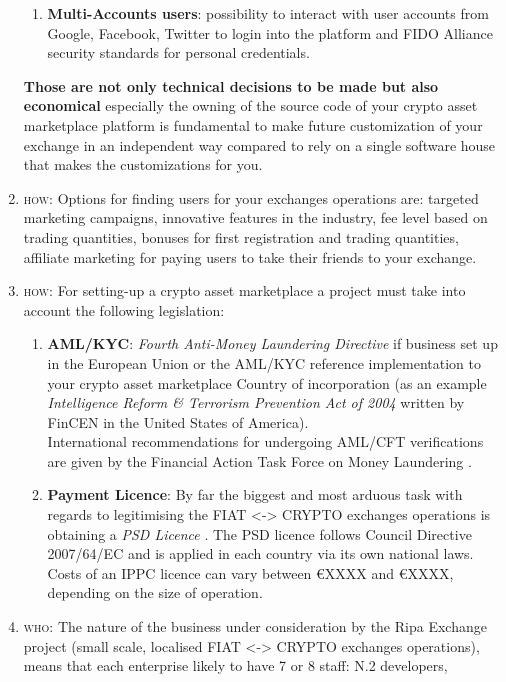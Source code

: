 \documentclass[11pt,fleqn,oneside]{book} %
\begin{document}
\begin{enumerate}
\begin{enumerate}[label*=\arabic*.]
			\item \textbf{Multi-Accounts users}: possibility to interact with user accounts from Google, Facebook, Twitter 
			to login into the platform and FIDO Alliance security standards for personal credentials.
		\end{enumerate}	
	\textbf{Those are not only technical decisions to be made but also economical} especially the owning of the source code of your crypto asset
	marketplace platform is fundamental to make future customization of your exchange in an independent way compared to rely on a single
	software house that makes the customizations for you.
	\item \textsc{how}: Options for finding users for your exchanges operations are: targeted marketing campaigns, innovative features in the industry,
	fee level based on trading quantities, bonuses for first registration and trading quantities, affiliate marketing for paying users to take their friends
	to your exchange.
	\item \textsc{how}: For setting-up a crypto asset marketplace a project must take into account the following legislation:
		\begin{enumerate}[label*=\arabic*.]
			\item \textbf{AML/KYC}: \textit{Fourth Anti-Money Laundering Directive} if business set up in the European Union \cite{4AMLD} or the AML/KYC reference implementation
			to your crypto asset marketplace Country of incorporation (as an example \textit{Intelligence Reform \& Terrorism Prevention Act of 2004}
			written by FinCEN in the United States of America).\\
			International recommendations for undergoing AML/CFT verifications are given by the Financial Action Task Force on Money Laundering \cite{FATF}.
			\item \textbf{Payment Licence}: By far the biggest and most arduous task with regards to legitimising the 
			FIAT <-> CRYPTO exchanges operations is obtaining a \textit{PSD Licence} \cite{PSD}. 
			The PSD licence follows Council Directive 2007/64/EC and is applied in each country via its own national laws. 
			Costs of an IPPC licence can vary between \euro XXXX and \euro XXXX, depending on the size of operation.
		\end{enumerate}
	\item \textsc{who}: The nature of the business under consideration by the Ripa Exchange project (small scale,
	localised FIAT <-> CRYPTO exchanges operations), means that each enterprise likely to have 7 or 8 staff: N.2 developers, 

\end{enumerate}
\end{document}
